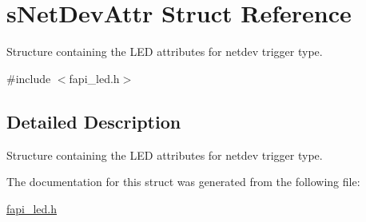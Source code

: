 \hypertarget{structsNetDevAttr}{\section{s\-Net\-Dev\-Attr Struct Reference}
\label{structsNetDevAttr}
}


Structure containing the L\-E\-D attributes for netdev trigger type.  




{\ttfamily \#include $<$fapi\-\_\-led.\-h$>$}



\subsection{Detailed Description}
Structure containing the L\-E\-D attributes for netdev trigger type. 



The documentation for this struct was generated from the following file\-:\begin{DoxyCompactItemize}
\item 
\hyperlink{fapi__led_8h}{fapi\-\_\-led.\-h}\end{DoxyCompactItemize}
